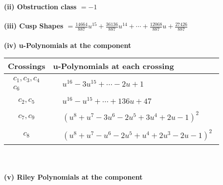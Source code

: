 \documentclass[1p]{elsarticle_modified}
\theoremstyle{definition}
\begin{document}
\flushleft \textbf{(ii) Obstruction class $= -1$}\\~\\
\flushleft \textbf{(iii) Cusp Shapes $= \frac{14664}{887} u^{15}+\frac{36136}{887} u^{14}+\cdots+\frac{12068}{887} u+\frac{27426}{887}$}\\~\\
\newpage\renewcommand{\arraystretch}{1}
\flushleft \textbf{(iv) u-Polynomials at the component}\newline \\
\begin{tabular}{m{50pt}|m{274pt}}
Crossings & \hspace{64pt}u-Polynomials at each crossing \\
\hline $$\begin{aligned}c_{1},c_{3},c_{4}\\c_{6}\end{aligned}$$&$\begin{aligned}
&u^{16}-3 u^{15}+\cdots-2 u+1
\end{aligned}$\\
\hline $$\begin{aligned}c_{2},c_{5}\end{aligned}$$&$\begin{aligned}
&u^{16}- u^{15}+\cdots+136 u+47
\end{aligned}$\\
\hline $$\begin{aligned}c_{7},c_{9}\end{aligned}$$&$\begin{aligned}
&(u^8+u^7-3 u^6-2 u^5+3 u^4+2 u-1)^2
\end{aligned}$\\
\hline $$\begin{aligned}c_{8}\end{aligned}$$&$\begin{aligned}
&(u^8+u^7- u^6-2 u^5+u^4+2 u^3-2 u-1)^2
\end{aligned}$\\
\hline
\end{tabular}\\~\\
\newpage\renewcommand{\arraystretch}{1}
\flushleft \textbf{(v) Riley Polynomials at the component}\newline \\
\end{document}
